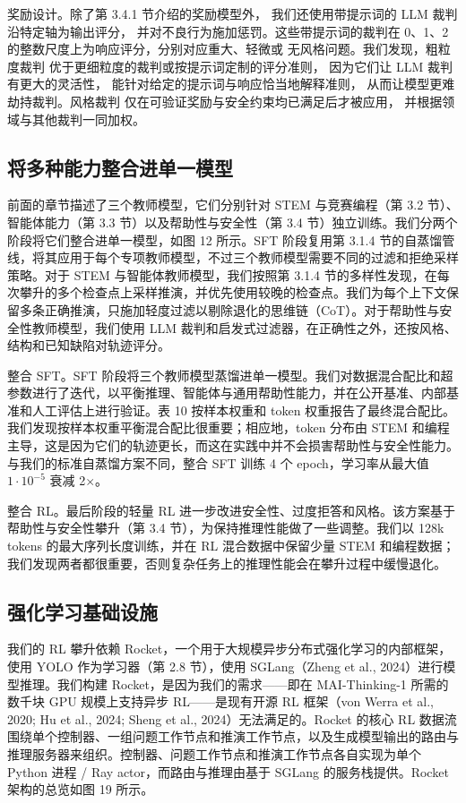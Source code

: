 \documentclass[
  10
]{article}
\begin{document}
奖励设计。除了第 3.4.1 节介绍的奖励模型外，
我们还使用带提示词的 LLM 裁判沿特定轴为输出评分，
并对不良行为施加惩罚。这些带提示词的裁判在
0、1、2 的整数尺度上为响应评分，分别对应重大、轻微或
无风格问题。我们发现，粗粒度裁判
优于更细粒度的裁判或按提示词定制的评分准则，
因为它们让 LLM 裁判有更大的灵活性，
能针对给定的提示词与响应恰当地解释准则，
从而让模型更难劫持裁判。风格裁判
仅在可验证奖励与安全约束均已满足后才被应用，
并根据领域与其他裁判一同加权。

\subsection{将多种能力整合进单一模型}\label{consolidating-capabilities-into-a-single-model}

前面的章节描述了三个教师模型，它们分别针对 STEM 与竞赛编程（第 3.2 节）、智能体能力（第 3.3 节）以及帮助性与安全性（第 3.4 节）独立训练。我们分两个阶段将它们整合进单一模型，如图 12 所示。SFT 阶段复用第 3.1.4 节的自蒸馏管线，将其应用于每个专项教师模型，不过三个教师模型需要不同的过滤和拒绝采样策略。对于 STEM 与智能体教师模型，我们按照第 3.1.4 节的多样性发现，在每次攀升的多个检查点上采样推演，并优先使用较晚的检查点。我们为每个上下文保留多条正确推演，只施加轻度过滤以剔除退化的思维链（CoT）。对于帮助性与安全性教师模型，我们使用 LLM 裁判和启发式过滤器，在正确性之外，还按风格、结构和已知缺陷对轨迹评分。

整合 SFT。SFT 阶段将三个教师模型蒸馏进单一模型。我们对数据混合配比和超参数进行了迭代，以平衡推理、智能体与通用帮助性能力，并在公开基准、内部基准和人工评估上进行验证。表 10 按样本权重和 token 权重报告了最终混合配比。我们发现按样本权重平衡混合配比很重要；相应地，token 分布由 STEM 和编程主导，这是因为它们的轨迹更长，而这在实践中并不会损害帮助性与安全性能力。与我们的标准自蒸馏方案不同，整合 SFT 训练 4 个 epoch，学习率从最大值 $1\cdot10^{-5}$ 衰减 2$\times$。

整合 RL。最后阶段的轻量 RL 进一步改进安全性、过度拒答和风格。该方案基于帮助性与安全性攀升（第 3.4 节），为保持推理性能做了一些调整。我们以 128k tokens 的最大序列长度训练，并在 RL 混合数据中保留少量 STEM 和编程数据；我们发现两者都很重要，否则复杂任务上的推理性能会在攀升过程中缓慢退化。

\subsection{强化学习基础设施}\label{reinforcement-learning-infrastructure}

我们的 RL 攀升依赖 Rocket，一个用于大规模异步分布式强化学习的内部框架，使用 YOLO 作为学习器（第 2.8 节），使用 SGLang（Zheng et al., 2024）进行模型推理。我们构建 Rocket，是因为我们的需求——即在 MAI-Thinking-1 所需的数千块 GPU 规模上支持异步 RL——是现有开源 RL 框架（von Werra et al., 2020; Hu et al., 2024; Sheng et al., 2024）无法满足的。Rocket 的核心 RL 数据流围绕单个控制器、一组问题工作节点和推演工作节点，以及生成模型输出的路由与推理服务器来组织。控制器、问题工作节点和推演工作节点各自实现为单个 Python 进程 / Ray actor，而路由与推理由基于 SGLang 的服务栈提供。Rocket 架构的总览如图 19 所示。
\end{document}
